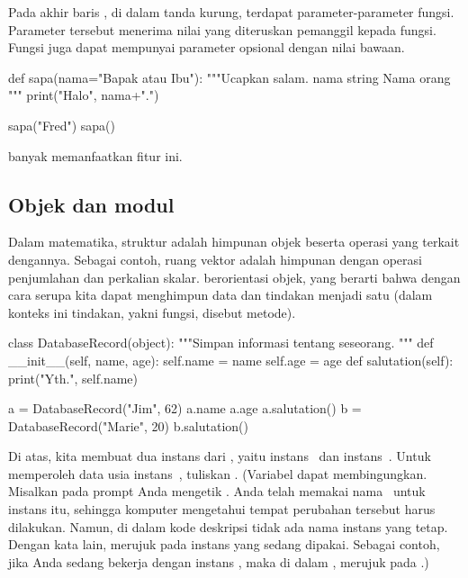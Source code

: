 Pada akhir baris , di dalam tanda kurung, terdapat
parameter-parameter fungsi. 
Parameter tersebut menerima nilai 
yang diteruskan pemanggil kepada fungsi.
Fungsi juga dapat mempunyai parameter opsional dengan nilai bawaan.
\begin{pythonconsole}
def sapa(nama="Bapak atau Ibu"):
    """Ucapkan salam.
      nama  string  Nama orang
    """
    print("Halo", nama+".")

sapa("Fred")
sapa()
\end{pythonconsole}
\Sage{} banyak memanfaatkan fitur \python{} ini.







\subsection{Objek dan modul}
Dalam matematika, struktur adalah himpunan objek beserta operasi yang terkait dengannya.
Sebagai contoh, ruang vektor adalah himpunan dengan operasi
penjumlahan dan perkalian skalar.
\python{} berorientasi objek, yang berarti bahwa dengan cara serupa kita dapat menghimpun
data dan tindakan menjadi satu (dalam konteks ini tindakan, yakni fungsi, 
disebut metode).
\begin{pythonconsole}
class DatabaseRecord(object):
    """Simpan informasi tentang seseorang.
    """
    def __init__(self, name, age):
        self.name = name
        self.age = age
    def salutation(self):
        print("Yth.", self.name)

a = DatabaseRecord("Jim", 62)
a.name
a.age
a.salutation()
b = DatabaseRecord("Marie", 20)
b.salutation()
\end{pythonconsole}
Di atas, kita membuat dua instans dari 
, yaitu instans~ dan
instans~.
Untuk memperoleh data usia instans~, tuliskan 
.
(Variabel \protect{} 
dapat membingungkan.
Misalkan pada prompt Anda mengetik .
Anda telah memakai nama~ 
untuk instans itu, sehingga komputer mengetahui tempat
perubahan tersebut harus dilakukan.
Namun,
di dalam kode deskripsi  tidak ada nama instans yang tetap.
Dengan kata lain,  merujuk pada instans yang sedang dipakai. 
Sebagai contoh, jika Anda sedang bekerja dengan instans , maka 
di dalam ,  merujuk
pada .)


